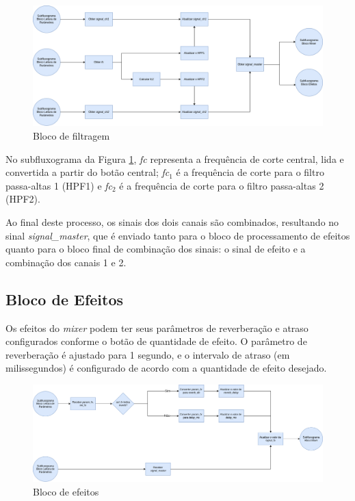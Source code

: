 \begin{figure}[h]
    \centering
    \includegraphics[width=\textwidth]{figuras/fig55.png}
    \caption{Bloco de filtragem}
    \label{fig55}
\end{figure}

No subfluxograma da Figura \ref{fig55}, \textit{fc} representa a frequência de corte central, lida e convertida a partir do botão central; \textit{fc$_{1}$} é a frequência de corte para o filtro passa-altas 1 (HPF1) e \textit{fc$_{2}$} é a frequência de corte para o filtro passa-altas 2 (HPF2).

Ao final deste processo, os sinais dos dois canais são combinados, resultando no sinal \textit{signal\_master}, que é enviado tanto para o bloco de processamento de efeitos quanto para o bloco final de combinação dos sinais: o sinal de efeito e a combinação dos canais 1 e 2.

\subsection{Bloco de Efeitos}

Os efeitos do \textit{mixer} podem ter seus parâmetros de reverberação e atraso configurados conforme o botão de quantidade de efeito. O parâmetro de reverberação é ajustado para 1 segundo, e o intervalo de atraso (em milissegundos) é configurado de acordo com a quantidade de efeito desejado.

\begin{figure}[h]
    \centering
    \includegraphics[width=\textwidth]{figuras/fig56.png}
    \caption{Bloco de efeitos}
    \label{fig56}
\end{figure}

